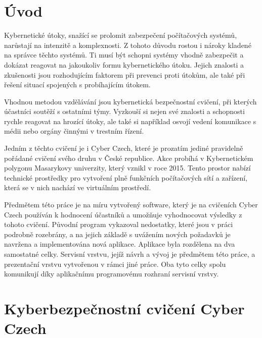 \documentclass[
  digital, %
  twoside, %
  table,   %
  lof,     %
  lot,     %
]{fithesis3}
\begin{document}
\chapter*{Úvod}

Kybernetické útoky, snažící se prolomit zabezpečení počítačových systémů, narůstají na intenzitě a komplexnosti. Z tohoto důvodu rostou i nároky kladené na správce těchto systémů. Ti musí být schopni systémy vhodně zabezpečit a dokázat reagovat na jakoukoliv formu kybernetického útoku. Jejich znalosti a zkušenosti jsou rozhodujícím faktorem při prevenci proti útokům, ale také při řešení situací spojených s probíhajícím útokem.

Vhodnou metodou vzdělávání jsou kybernetická bezpečnostní cvičení, při kterých účastníci soutěží s ostatními týmy. Vyzkouší si nejen své znalosti a schopnosti rychle reagovat na hrozící útoky, ale také si například osvojí vedení komunikace s médii nebo orgány činnými v trestním řízení.

Jedním z těchto cvičení je i Cyber Czech, které je prozatím jediné pravidelně pořádané cvičení svého druhu v České republice. \cite{cyberex} Akce probíhá v Kybernetickém polygonu Masarykovy univerzity, který vznikl v roce 2015. Tento prostor nabízí technické prostředky pro vytvoření plně funkčních počítačových sítí a zařízení, která se v nich nachází ve virtuálním prostředí.

Předmětem této práce je na míru vytvořený software, který je na cvičeních Cyber Czech používán k hodnocení účastníků a umožňuje vyhodnocovat výsledky z tohoto cvičení. Původní program vykazoval nedostatky, které jsou v práci podrobně rozebrány, a na jejich základě s uvážením nových požadavků je navržena a implementována nová aplikace. Aplikace byla rozdělena na dva samostatné celky. Servisní vrstvu, jejíž návrh a vývoj je předmětem této práce, a prezentační vrstvu vytvořenou v rámci jiné práce. Oba tyto celky spolu komunikují díky aplikačnímu programovému rozhraní servisní vrstvy. 

\chapter{Kyberbezpečnostní cvičení Cyber Czech}
\end{document}
